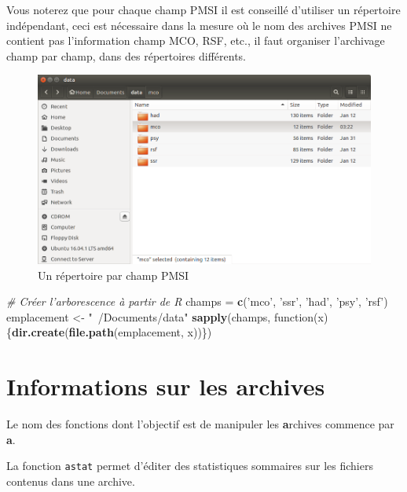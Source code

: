 \documentclass[]{book}
\newenvironment{Shaded}{\begin{snugshade}}{\end{snugshade}}
\newcommand{\KeywordTok}[1]{\textcolor[rgb]{0.13,0.29,0.53}{\textbf{{#1}}}}
\newcommand{\StringTok}[1]{\textcolor[rgb]{0.31,0.60,0.02}{{#1}}}
\newcommand{\CommentTok}[1]{\textcolor[rgb]{0.56,0.35,0.01}{\textit{{#1}}}}
\newcommand{\NormalTok}[1]{{#1}}
\begin{document}
Vous noterez que pour chaque champ PMSI il est conseillé d'utiliser un
répertoire indépendant, ceci est nécessaire dans la mesure où le nom des
archives PMSI ne contient pas l'information champ MCO, RSF, etc., il
faut organiser l'archivage champ par champ, dans des répertoires
différents.

\begin{figure}[htbp]
\centering
\includegraphics{images/champ_par_champ.png}
\caption{Un répertoire par champ PMSI}
\end{figure}

\begin{Shaded}
\begin{Highlighting}[]
\CommentTok{# Créer l'arborescence à partir de R}
\NormalTok{champs =}\StringTok{ }\KeywordTok{c}\NormalTok{(}\StringTok{'mco'}\NormalTok{, }\StringTok{'ssr'}\NormalTok{, }\StringTok{'had'}\NormalTok{, }\StringTok{'psy'}\NormalTok{, }\StringTok{'rsf'}\NormalTok{)}
\NormalTok{emplacement <-}\StringTok{ "~/Documents/data"}
\KeywordTok{sapply}\NormalTok{(champs, function(x)\{}\KeywordTok{dir.create}\NormalTok{(}\KeywordTok{file.path}\NormalTok{(emplacement, x))\})}
\end{Highlighting}
\end{Shaded}

\section{Informations sur les
archives}\label{informations-sur-les-archives}

Le nom des fonctions dont l'objectif est de manipuler les
\textbf{a}rchives commence par \textbf{a}.

La fonction \texttt{astat} permet d'éditer des statistiques sommaires
sur les fichiers contenus dans une archive.
\end{document}
